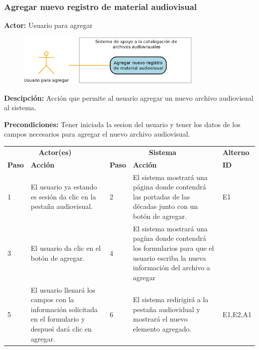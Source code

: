\documentclass[10pt,letterpaper]{article}
\begin{document}
\subsubsection{Agregar nuevo registro de material audiovisual}
\textbf{Actor:} Usuario para agregar

\begin{figure}[H]
	\centering
	\includegraphics[width=0.8\textwidth]{CasoDeUso_Agregar_AgregarNuevoRegistro.png}
\end{figure}

\textbf{Descipción: } Acción que permite al usuario agregar un nuevo archivo audiovisual al sistema.

\textbf{Precondiciones:} Tener iniciada la sesion del usuario y tener los datos de los campos necesarios para agregar el nuevo archivo audiovisual.

\begin{adjustwidth}{-6em}{-6em}
	\begin{center}
		\begin{tabularx}{1.2\textwidth}{ | p{0.7cm} | X | p{0.7cm} | X | p{1.5cm} | }
			\hline
			\rowcolor{NewBlue} \multicolumn{5}{|c|}{\textbf{Flujo normal de eventos}} \\
			\hline
			\multicolumn{2}{|c|}{\textbf{Actor(es)}}	&	\multicolumn{2}{c|}{\textbf{Sistema}}	&	\textbf{Alterno} \\
			\hline
			\textbf{Paso}	&	\textbf{Acción}	&	\textbf{Paso}	&	\textbf{Acción}	&	\textbf{ID} \\
			\hline
			1 & 
			 El usuario ya estando es sesión da clic en la pestaña audiovisual.&
			2 &
			El sistema mostrará una página donde contendrá las portadas de las décadas junto con un botón de agregar.&
			E1
			\\
			\hline
			3 & 
			 El usuario da clic en el botón de agregar.&
			4 &
			El sistema mostrará una pagína donde contendrá los formularios para que el usuario escriba la nueva información del archivo a agregar&
			\\
			\hline
			5 & 
			 El usuario llenará los campos con la información solicitada en el formulario y despueś dará clic en agregar.&
			6 &
			El sistema redirigirá a la pestaña audiovidual y mostrará el nuevo elemento agregado.&
			E1,E2,A1
			\\
			\hline
		\end{tabularx}
	\end{center}
\end{adjustwidth}
\end{document}
